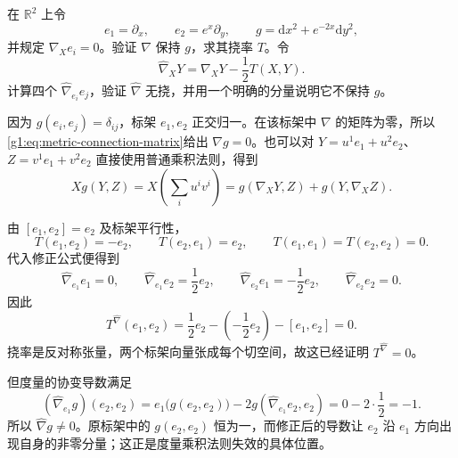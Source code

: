 \begin{exercise}\label{g1:ex:torsion-correction-breaks-metric}
	在 \(\mathbb R^2\) 上令
	\[
		e_1=\partial_x,\qquad e_2=e^x\partial_y,\qquad
		g=\mathrm{d}x^2+e^{-2x}\mathrm{d}y^2,
	\]
	并规定 \(\nabla_Xe_i=0\)。验证 \(\nabla\) 保持 \(g\)，求其挠率 \(T\)。令
	\[
		\widehat\nabla_XY=\nabla_XY-\frac12T(X,Y).
	\]
	计算四个 \(\widehat\nabla_{e_i}e_j\)，验证 \(\widehat\nabla\) 无挠，并用一个明确的分量说明它不保持 \(g\)。
\end{exercise}
\begin{solution}
	因为 \(g(e_i,e_j)=\delta_{ij}\)，标架 \(e_1,e_2\) 正交归一。在该标架中 \(\nabla\) 的矩阵为零，所以\eqref{g1:eq:metric-connection-matrix}给出 \(\nabla g=0\)。也可以对 \(Y=u^1e_1+u^2e_2\)、\(Z=v^1e_1+v^2e_2\) 直接使用普通乘积法则，得到
	\[
		Xg(Y,Z)=X\left(\sum_i u^iv^i\right)
		=g(\nabla_XY,Z)+g(Y,\nabla_XZ).
	\]

	由 \([e_1,e_2]=e_2\) 及标架平行性，
	\[
		T(e_1,e_2)=-e_2,\qquad T(e_2,e_1)=e_2,\qquad
		T(e_1,e_1)=T(e_2,e_2)=0.
	\]
	代入修正公式便得到
	\[
		\widehat\nabla_{e_1}e_1=0,\qquad
		\widehat\nabla_{e_1}e_2=\frac12e_2,\qquad
		\widehat\nabla_{e_2}e_1=-\frac12e_2,\qquad
		\widehat\nabla_{e_2}e_2=0.
	\]
	因此
	\[
		T^{\widehat\nabla}(e_1,e_2)
		=\frac12e_2-\left(-\frac12e_2\right)-[e_1,e_2]=0.
	\]
	挠率是反对称张量，两个标架向量张成每个切空间，故这已经证明 \(T^{\widehat\nabla}=0\)。

	但度量的协变导数满足
	\[
		(\widehat\nabla_{e_1}g)(e_2,e_2)
		=e_1\bigl(g(e_2,e_2)\bigr)
		-2g(\widehat\nabla_{e_1}e_2,e_2)
		=0-2\cdot\frac12=-1.
	\]
	所以 \(\widehat\nabla g\ne0\)。原标架中的 \(g(e_2,e_2)\) 恒为一，而修正后的导数让 \(e_2\) 沿 \(e_1\) 方向出现自身的非零分量；这正是度量乘积法则失效的具体位置。
\end{solution}

